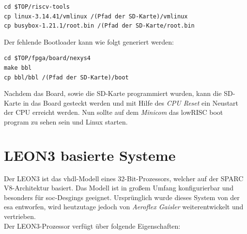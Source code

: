 \begin{lstlisting}
cd $TOP/riscv-tools
cp linux-3.14.41/vmlinux /(Pfad der SD-Karte)/vmlinux
cp busybox-1.21.1/root.bin /(Pfad der SD-Karte/root.bin
\end{lstlisting}


Der fehlende Bootloader kann wie folgt generiert werden:\\

\begin{lstlisting}
cd $TOP/fpga/board/nexys4
make bbl
cp bbl/bbl /(Pfad der SD-Karte)/boot
\end{lstlisting}

Nachdem das Board, sowie die SD-Karte programmiert wurden, kann die SD-Karte in das Board gesteckt werden und mit Hilfe des \emph{CPU Reset} ein Neustart der CPU erreicht werden.
Nun sollte auf dem \emph{Minicom} das lowRISC boot program zu sehen sein und Linux starten.\\
\newpage

\section{LEON3 basierte Systeme}\label{kap:leon3}

Der LEON3 ist das \ac{vhdl}-Modell eines 32-Bit-Prozessors, welcher auf der SPARC V8-Architektur basiert. Das Modell ist in großem Umfang konfigurierbar und besonders für \ac{soc}-Desgings geeignet.
Ursprünglich wurde dieses System von der \ac{esa} entworfen, wird heutzutage jedoch von \emph{Aeroflex Gaisler} weiterentwickelt und vertrieben.\\
Der LEON3-Prozessor verfügt über folgende Eigenschaften:\cite{leon}\\


